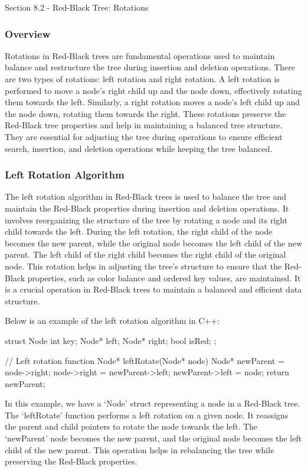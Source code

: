 \begin{notes}{Section 8.2 - Red-Black Tree: Rotations}
    \subsubsection{Overview}

    Rotations in Red-Black trees are fundamental operations used to maintain balance and restructure the tree during insertion and deletion operations. There are two types of rotations: left rotation and right rotation. A left rotation is performed to move a node's right child up and the node down, effectively rotating them towards the left. 
    Similarly, a right rotation moves a node's left child up and the node down, rotating them towards the right. These rotations preserve the Red-Black tree properties and help in maintaining a balanced tree structure. They are essential for adjusting the tree during operations to ensure efficient search, insertion, and deletion operations 
    while keeping the tree balanced.
    
    \subsubsection{Left Rotation Algorithm}
    
    The left rotation algorithm in Red-Black trees is used to balance the tree and maintain the Red-Black properties during insertion and deletion operations. It involves reorganizing the structure of the tree by rotating a node and its right child towards the left. During the left rotation, the right child of the node becomes the new parent,
    while the original node becomes the left child of the new parent. The left child of the right child becomes the right child of the original node. This rotation helps in adjusting the tree's structure to ensure that the Red-Black properties, such as color balance and ordered key values, are maintained. It is a crucial operation in Red-Black trees 
    to maintain a balanced and efficient data structure.
    
    \begin{highlight}
        Below is an example of the left rotation algorithm in C++:
    
    \begin{code}[C++]
    struct Node {
        int key;
        Node* left;
        Node* right;
        bool isRed;
    };
    
    // Left rotation function
    Node* leftRotate(Node* node) {
        Node* newParent = node->right;
        node->right = newParent->left;
        newParent->left = node;
        return newParent;
    }
    \end{code}
        In this example, we have a `Node' struct representing a node in a Red-Black tree. The `leftRotate' function performs a left rotation on a given node. It reassigns the parent and child pointers to rotate the node towards the left. The `newParent' node becomes the new parent, and the original node becomes the left child of the new parent. 
        This operation helps in rebalancing the tree while preserving the Red-Black properties.
    

\end{highlight}
\end{notes}
